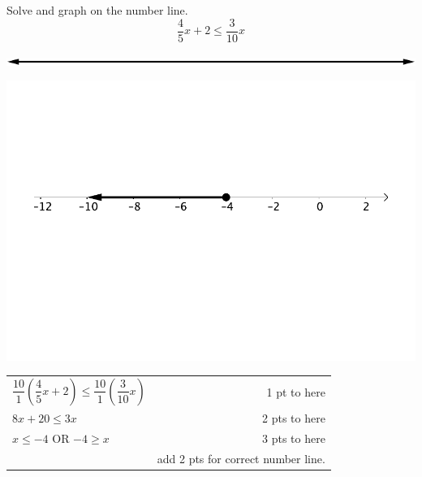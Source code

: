 {
	Solve and graph on the number line. $$\frac{4}{5}x+2 \leq \frac{3}{10}x$$\begin{onlyproblem}\begin{center}\includegraphics{numberLineNoNumbersNoTicks}\end{center}\end{onlyproblem} \begin{onlysolution}\begin{center}\includegraphics{fig095-07-5-c-answer}\end{center}\end{onlysolution}
}
{
	\begin{tabular}{l r}
	$\dfrac{10}{1}\left(\dfrac{4}{5}x+2\right) \leq \dfrac{10}{1}\left(\dfrac{3}{10}x\right)$ & 1 pt to here \\
	$8x+20\leq 3x$ & 2 pts to here \\
	$x\leq -4$ OR $-4\geq x$ & 3 pts to here \\
	 & add 2 pts for correct number line.
	\end{tabular}
}

